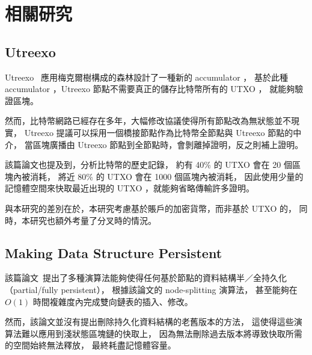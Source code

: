 \chapter{相關研究}
\label{c:related}

\section{Utreexo}
Utreexo~\cite{dryja2019utreexo} 應用梅克爾樹構成的森林設計了一種新的 accumulator ，
基於此種 accumulator ，Utreexo 節點不需要真正的儲存比特幣所有的 UTXO ，
就能夠驗證區塊。

然而，比特幣網路已經存在多年，大幅修改協議使得所有節點改為無狀態並不現實，
Utreexo 提議可以採用一個橋接節點作為比特幣全節點與 Utreexo 節點的中介，
當區塊廣播由 Utreexo 節點到全節點時，會剝離掉證明，反之則補上證明。

該篇論文也提及到，分析比特幣的歷史記錄，
約有 40\% 的 UTXO 會在 20 個區塊內被消耗，
將近 80\% 的 UTXO 會在 1000 個區塊內被消耗，
因此使用少量的記憶體空間來快取最近出現的 UTXO ，就能夠省略傳輸許多證明。

與本研究的差別在於，本研究考慮基於賬戶的加密貨幣，而非基於 UTXO 的，
同時，本研究也額外考量了分叉時的情況。

\section{Making Data Structure Persistent}
該篇論文~\cite{driscoll1986making}提出了多種演算法能夠使得任何基於節點的資料結構半／全持久化（partial/fully persistent），
根據該論文的 node-splitting 演算法，
甚至能夠在 $O(1)$ 時間複雜度內完成雙向鏈表的插入、修改。

然而，該論文並沒有提出刪除持久化資料結構的老舊版本的方法，
這使得這些演算法難以應用到淺狀態區塊鏈的快取上，
因為無法刪除過去版本將導致快取所需的空間始終無法釋放，
最終耗盡記憶體容量。